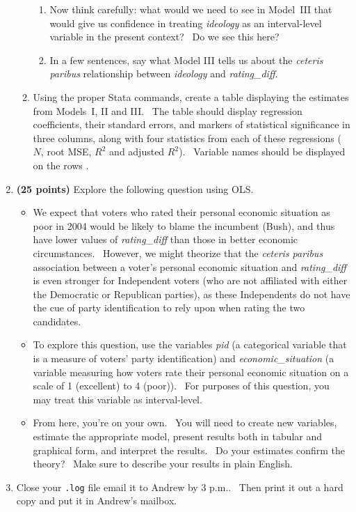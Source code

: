 \documentclass[11pt]{article}
\begin{document}
\begin{enumerate}
\begin{enumerate}
\begin{enumerate}
\item Now think carefully: what would we need to see in Model\ III that
would give us confidence in treating \textit{ideology} as an interval-level
variable in the present context? \ Do we see this here?

\item In a few sentences, say what Model III tells us about the \textit{%
ceteris paribus} relationship between \textit{ideology} and \textit{%
rating\_diff}.
\end{enumerate}

\item Using the proper Stata commands, create a table displaying the
estimates from Models\ I, II and III. \ The table should display regression
coefficients, their standard errors, and markers of statistical significance
in three columns, along with four statistics from each of these regressions (%
$N$, root MSE, $R^{2}$ and adjusted $R^{2}$). \ Variable names should be
displayed on the rows .\bigskip \newpage
\end{enumerate}

\item \textbf{(25 points) }Explore the following question using OLS. \ 

\begin{itemize}
\item We expect that voters who rated their personal economic situation as
poor in 2004 would be likely to blame the incumbent (Bush), and thus have
lower values of \textit{rating\_diff }than those in better economic
circumstances. \ However, we might theorize that the \textit{ceteris paribus 
}association between a voter's personal economic situation and \textit{%
rating\_diff }is even stronger for Independent voters (who are not
affiliated with either the Democratic or Republican parties), as these
Independents do not have the cue of party identification to rely upon when
rating the two candidates.

\item To explore this question, use the variables \textit{pid} (a
categorical variable that is a measure of voters' party identification) and 
\textit{economic\_situation }(a variable measuring how voters rate their
personal economic situation on a scale of 1 (excellent) to 4 (poor)). \ For
purposes of this question, you may treat this variable as interval-level.

\item From here, you're on your own. \ You will need to create new
variables, estimate the appropriate model, present results both in tabular
and graphical form, and interpret the results. \ Do your estimates confirm
the theory? \ Make sure to describe your results in plain English.\bigskip
\end{itemize}

\item Close your \texttt{.log} file email it to Andrew by 3 p.m.. \ Then
print it out a hard copy and put it in Andrew's mailbox. \ 
\end{enumerate}
\end{document}
